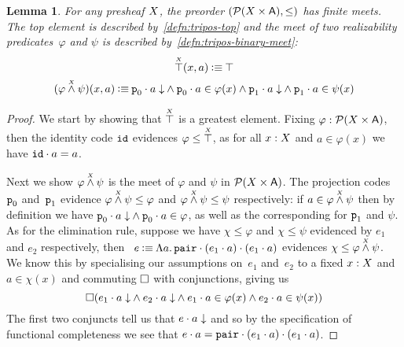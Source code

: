 \documentclass[11pt]{article}
\newtheorem{lemm}[thrm]{Lemma}
\begin{document}
\begin{lemm}\label{lemm:tripos-finite-meets}
  For any presheaf \(X\), the preorder \((\mathcal{P}{({X}\times{\ensuremath{\mathsf{A}}})}, \leq)\) has finite
  meets.
  The top element is described by~\ref{defn:tripos-top} and the meet of two
  realizability predicates~\(\varphi\) and \(\psi\) is described
  by~\ref{defn:tripos-binary-meet}:
  \begin{gather}
    \TTop{\X}(x,a)
    \IsDefined
    \ITop
    \label{defn:tripos-top}
    \\
    (\TAnd{\varphi}{\psi}{\X})(x,a)
    \IsDefined
    \IAnd%
      {\IAnd{\ITotal{\IAp{\IFstCode}{a}}}{\IAp{\IFstCode}{a}\in\varphi(x)}}%
      {\IAnd{\ITotal{\IAp{\ISndCode}{a}}}{\IAp{\ISndCode}{a}\in\psi(x)}}
    \label{defn:tripos-binary-meet}
  \end{gather}
\end{lemm}
\begin{proof}
  We start by showing that \(\overset{\scriptscriptstyle X}{\top}\) is a greatest element.
  Fixing \(\varphi:\mathcal{P}{({X}\times{\ensuremath{\mathsf{A}}})}\), then the identity code \(\texttt{id}\)
  evidences \(\varphi \leq \overset{\scriptscriptstyle X}{\top}\), as for all \(x : X\) and
  \(a \in \varphi(x)\) we have \({\texttt{id}}\cdot{a} = a\).

  Next we show \({\varphi}\overset{\scriptscriptstyle X}{\land}{\psi}\) is the meet of \(\varphi\) and
  \(\psi\) in \(\mathcal{P}{({X}\times{\ensuremath{\mathsf{A}}})}\).
  The projection codes~\(\texttt{p}_0\) and~\(\texttt{p}_1\) evidence
  \({\varphi}\overset{\scriptscriptstyle X}{\land}{\psi}\leq\varphi\) and
  \({\varphi}\overset{\scriptscriptstyle X}{\land}{\psi}\leq\psi\) respectively:
  if \(a \in {\varphi}\overset{\scriptscriptstyle X}{\land}{\psi}\) then by definition we have
  \({{{\texttt{p}_0}\cdot{a}}\downarrow}\land{{\texttt{p}_0}\cdot{a}\in\varphi}\), as
  well as the corresponding for \(\texttt{p}_1\) and \(\psi\).
  As for the elimination rule, suppose we have \(\chi\leq\varphi\) and
  \(\chi\leq\psi\) evidenced by \(e_{1}\) and \(e_{2}\) respectively,
  then~%
  \(
    e \mathbin{\vcentcolon\equiv}
    \Lambda{a}.\,{{{\texttt{pair}}\cdot{({e_{1}}\cdot{a})}}\cdot{({e_{1}}\cdot{a})}}
  \)
  evidences \(\chi\leq{\varphi}\overset{\scriptscriptstyle X}{\land}{\psi}\).
  We know this by specialising our assumptions on~\(e_{1}\) and~\(e_{2}\)
  to a fixed \(x:X\) and \(a\in\chi(x)\) and commuting \(\Box\) with
  conjunctions, giving us
  \[
    \Box{
      ({
        {{{e_{1}}\cdot{a}}\downarrow}\land{{{e_{2}}\cdot{a}}\downarrow}
      }\land{
        {{e_{1}}\cdot{a}\in\varphi(x)}\land{{e_{2}}\cdot{a}\in\psi(x)}
      })
    }
  \]
  The first two conjuncts tell us that \({{e}\cdot{a}}\downarrow\) and so by the
  specification of functional completeness we see that
  \({e}\cdot{a} = {{\texttt{pair}}\cdot{({e_{1}}\cdot{a})}}\cdot{({e_{1}}\cdot{a})}\).
\end{proof}
\end{document}
